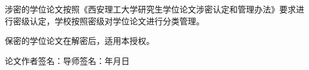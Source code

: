 {涉密的学位论文按照《西安理工大学研究生学位论文涉密认定和管理办法》要求进行密级认定，学校按照密级对学位论文进行分类管理。

保密的学位论文在解密后，适用本授权。

\vspace*{42pt}

\begin{flushright}
论文作者签名：\underline{\hspace{2cm}}\hspace{1cm}导师签名：\underline{\hspace{2cm}}\hspace{2cm}年\hspace{0.8cm}月\hspace{0.8cm}日
\end{flushright}
}
\cleardoublepage %
\restoregeometry %